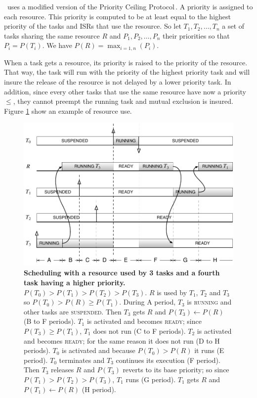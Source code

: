 \osek\ uses a modified version of the Priority Ceiling Protocol\,\cite{PCP}. A priority is assigned to each resource. This 
priority is computed to be at least equal to the highest priority of the tasks and ISRs that use the resource. So let $T_1, T_2, \dots, T_n$ a set of tasks sharing the same resource $R$ and $P_1, P_2, \dots, P_n$ their priorities so that $P_i = P(T_i)$. We have $P(R) = \max_{i=1,n}(P_i)$.

When a task gets a resource, its priority is raised to the priority of the resource. That way, the task will run with the priority of the highest priority task and will insure the release of the resource is not delayed by a lower priority task. In addition, since every other tasks that use the same resource have now a priority $\leq$, they cannot preempt the running task and mutual exclusion is insured. Figure \ref{fig:exampleResource} show an example of resource use.

\begin{figure}[htbp] %
   \centering
   \includegraphics[scale=.7]{pictures/schedulingResource.pdf} 
   \caption{{\bfseries Scheduling with a resource used by 3 tasks and a fourth task having a higher priority.} $P(T_0)>P(T_1)>P(T_2)>P(T_3)$. $R$ is used by $T_1$, $T_2$ and $T_3$ so $P(T_0)>P(R)\ge P(T_1)$. During A period, $T_3$ is {\sffamily\scshape running} and other tasks are {\sffamily\scshape suspended}. Then $T_3$ gets $R$ and $P(T_3) \leftarrow P(R)$ (B to F periods). $T_1$ is activated and becomes {\sffamily\scshape ready}; since $P(T_3) \ge P(T_1)$, $T_1$ does not run (C to F periods). $T_2$ is activated and becomes {\sffamily\scshape ready}; for the same reason it does not run (D to H periods). $T_0$ is activated and because $P(T_0)>P(R)$ it runs (E period). $T_0$ terminates and $T_3$ continues its execution (F period). Then $T_3$ releases $R$ and $P(T_3)$ reverts to its base priority; so since $P(T_1)>P(T_2)>P(T_3)$, $T_1$ runs (G period). $T_1$ gets $R$ and $P(T_1) \leftarrow P(R)$ (H period).}
   \label{fig:exampleResource}
\end{figure} 

